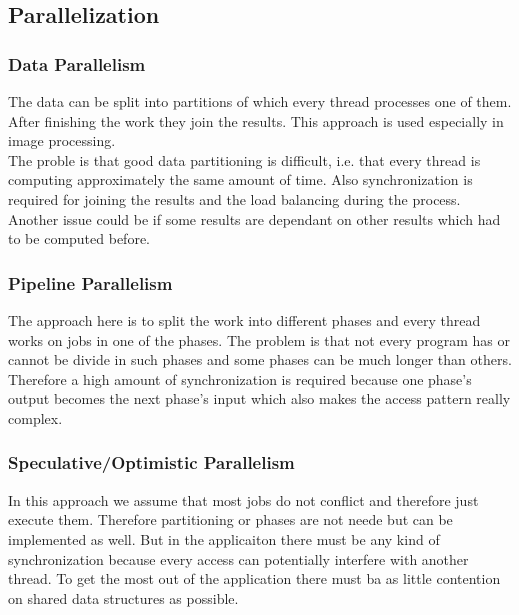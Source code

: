\documentclass{article}
\begin{document}
\begin{adjustwidth}{2em}{2em}
		\subsection{Parallelization}
		\begin{adjustwidth}{2em}{2em}
			\subsubsection{Data Parallelism}
			\begin{adjustwidth}{1em}{}
				The data can be split into partitions of which every thread processes one of them. After finishing the work they join the results. This approach is used especially in image processing. \\
				The proble is that good data partitioning is difficult, i.e. that every thread is computing approximately the same amount of time. Also synchronization is required for joining the results and the load balancing during the process. Another issue could be if some results are dependant on other results which had to be computed before.
			\end{adjustwidth}
			\subsubsection{Pipeline Parallelism}
			\begin{adjustwidth}{1em}{}
				The approach here is to split the work into different phases and every thread works on jobs in one of the phases. The problem is that not every program has or cannot be divide in such phases and some phases can be much longer than others. Therefore a high amount of synchronization is required because one phase's output becomes the next phase's input which also makes the access pattern really complex.
			\end{adjustwidth}
			\subsubsection{Speculative/Optimistic Parallelism}
			\begin{adjustwidth}{1em}{}
				In this approach we assume that most jobs do not conflict and therefore just execute them. Therefore partitioning or phases are not neede but can be implemented as well. But in the applicaiton there must be any kind of synchronization because every access can potentially interfere with another thread. To get the most out of the application there must ba as little contention on shared data structures as possible.
			\end{adjustwidth}
		\end{adjustwidth}

\end{adjustwidth}
\end{document}

